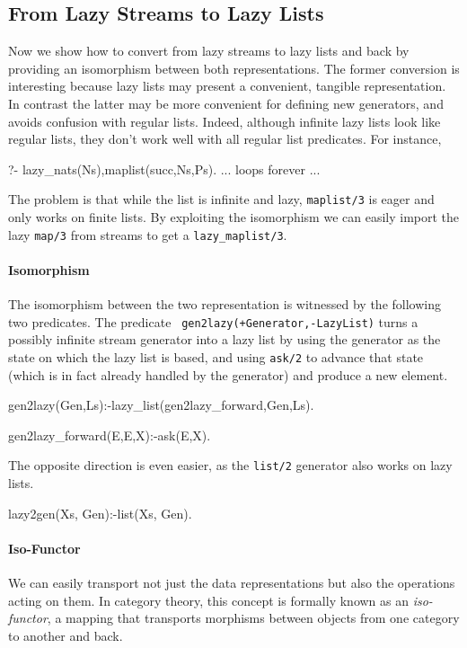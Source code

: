 \documentclass{new_tlp}
\begin{document}
\subsection{From Lazy Streams to Lazy Lists}

Now we show how to convert from lazy streams to lazy lists and back by
providing an isomorphism between both representations.
The former conversion is interesting because lazy lists may present a convenient, tangible 
representation. In contrast the latter may be more convenient for defining new
generators, and avoids confusion with regular lists.
Indeed, although infinite lazy lists look like regular lists, they don't work
well with all regular list predicates. For instance,
\begin{codex}
?- lazy_nats(Ns),maplist(succ,Ns,Ps).
... loops forever ...
\end{codex}
The problem is that while the list is infinite and lazy, {\tt maplist/3} is eager
and only works on finite lists.
By exploiting the isomorphism we can easily import the lazy {\tt map/3} from
streams to get a {\tt lazy\_maplist/3}.

\paragraph{Isomorphism} The isomorphism between the two representation is
witnessed by the following two predicates.  The predicate {\tt
gen2lazy(+Generator,-LazyList)} turns a possibly infinite stream generator into
a lazy list by using the generator as the state on which the lazy list is
based, and using \texttt{ask/2} to advance that state (which is in fact already
handled by the generator) and produce a new element.
\begin{code} 
gen2lazy(Gen,Ls):-lazy_list(gen2lazy_forward,Gen,Ls).

gen2lazy_forward(E,E,X):-ask(E,X).
\end{code}
The opposite direction is even easier, as the {\tt list/2} generator also works
on lazy lists.
\begin{code}
lazy2gen(Xs, Gen):-list(Xs, Gen).
\end{code}


\paragraph{Iso-Functor}
We can easily transport not just the data representations but also the
operations acting on them. In category theory, this concept is formally known
as an {\em iso-functor}, a mapping that transports morphisms between objects
from one category to another and back. 
\end{document}
